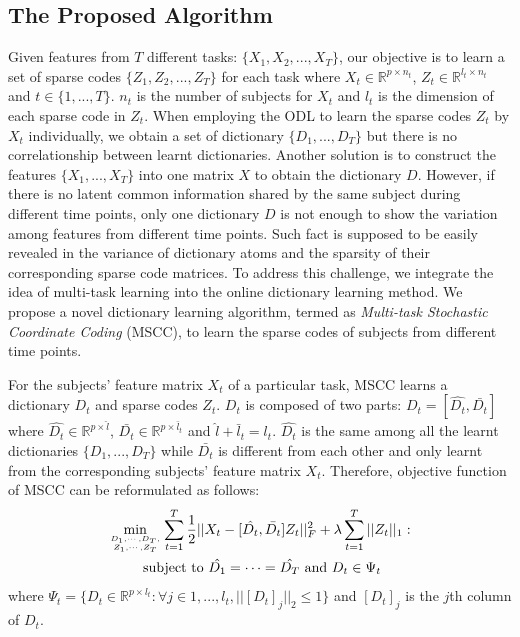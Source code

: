 \documentclass[10pt,twocolumn,letterpaper]{article}
\begin{document}
\subsection{The Proposed Algorithm}
\label{chap:2}
Given features from $T$ different tasks: $\{X_1,$$X_2$$,...,X_T\}$, our objective is to learn a set of sparse codes $\{Z_1,Z_2,...,Z_T\}$ for  each task where $X_t \in  \mathbb{R}^{p\times n_t }$, $Z_t \in  \mathbb{R}^{l_t\times n_t}$ and $t\in \{1,...,T\}$. $n_t$ is the number of subjects for $X_t$ and $l_t$ is the dimension of each sparse code in $Z_t$. When employing the ODL to learn the sparse codes $Z_t$ by $X_t$ individually, we obtain a set of dictionary $\{D_1,...,D_T\}$ but there is no correlationship between learnt dictionaries. Another solution is to construct the features $\{X_1,...,X_T\}$ into one matrix $X$ to obtain the dictionary $D$.
However, if there is no latent common information shared by the same subject during different time points, only one dictionary $D$ is not enough to show the variation among features from different time points. Such fact is supposed to be easily revealed in the variance of dictionary atoms and the sparsity of their corresponding sparse code matrices. To address this challenge, we integrate the idea of multi-task learning into the online dictionary learning method. We propose a novel dictionary learning algorithm, termed as \emph{Multi-task Stochastic Coordinate Coding} (MSCC), to learn the sparse codes of subjects from different time points.\par

For the subjects' feature matrix $X_t$ of a particular task, MSCC learns a dictionary $D_t$ and sparse codes $Z_t$. $D_t$ is composed of two parts:
$D_t = [\hat{D_t}, \bar{D_t}]$ where $\hat{D_t}\in \mathbb{R}^{p\times \hat{l}} $, $\bar{D_t}\in\mathbb{R}^ {p\times\bar{l}_t}$ and
$\hat{l}+\bar{l}_t=l_t$. $\hat{D_t}$ is the same among all the learnt dictionaries $\{D_1,...,D_T\}$ while $\bar{D_t}$ is different from each
other and only learnt from the corresponding subjects' feature matrix $X_t$. Therefore, objective function of MSCC can be reformulated as follows:
\vspace{-0.5em}
\begin{multline}
\min_{D_1,\cdots,D_T,\atop Z_1,\cdots,Z_T } \sum_{t=1}^{T}  \frac{1}{2}||X_t-[\hat{D_t},\bar{D_t}]Z_t||^2_F+\lambda  \sum_{t=1}^{T}  ||Z_t||_1 : \\ \text{ subject to } \hat{D_1} =\cdots=\hat{D_T} \text{ and } D_t \in \Psi_t
\label{eq:3}
\end{multline}
where $\Psi_t = \{ D_t \in \mathbb{R}^{p\times l_t}: \forall j\in 1,...,l_t, ||[D_t]_j||_2 \leq 1 \}$ and $[D_t]_j$ is the $j$th column of $D_t$.
\end{document}
